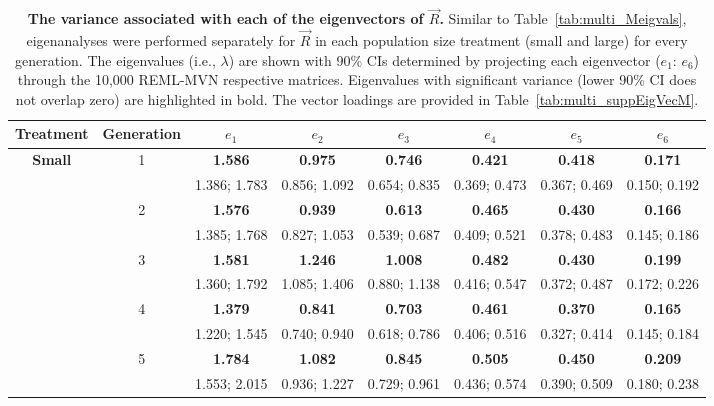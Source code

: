 \newpage
\begin{table}[!ht]
\renewcommand{\arraystretch}{0.9}
\caption[The variance associated with each of the eigenvectors of $\vec{R}$.]{\textbf{The variance associated with each of the eigenvectors of $\vec{R}$.} Similar to Table~\ref{tab:multi_Meigvals}, eigenanalyses were performed separately for $\vec{R}$ in each population size treatment (small and large) for every generation. The eigenvalues (i.e., $\lambda$) are shown with 90\% CIs determined by projecting each eigenvector ($e_1$: $e_6$) through the 10,000 REML-MVN respective matrices. Eigenvalues with significant variance (lower 90\% CI does not overlap zero) are highlighted in bold. The vector loadings are provided in Table~\ref{tab:multi_suppEigVecM}.}
\label{tab:multi_Reigvals}
\begin{center}
\scriptsize
\begin{tabular}{>{\bfseries}cccccccc}
\toprule
\textbf{Treatment}& \textbf{Generation} & $e_1$& $e_2$& $e_3$& $e_4$& $e_5$& {$e_6$} \\
\midrule
Small & 1 & \textbf{1.586} & \textbf{0.975} & \textbf{0.746} & \textbf{0.421} & \textbf{0.418} & \textbf{0.171} \\
 &  & 1.386; 1.783 & 0.856; 1.092 & 0.654; 0.835 & 0.369; 0.473 & 0.367; 0.469 & 0.150; 0.192\\[1.2ex]
 & 2 & \textbf{1.576} & \textbf{0.939} & \textbf{0.613} & \textbf{0.465} & \textbf{0.430} & \textbf{0.166} \\
 &  & 1.385; 1.768 & 0.827; 1.053 & 0.539; 0.687 & 0.409; 0.521 & 0.378; 0.483 & 0.145; 0.186\\[1.2ex][1.2ex]
 & 3 & \textbf{1.581} & \textbf{1.246} & \textbf{1.008} & \textbf{0.482} & \textbf{0.430} & \textbf{0.199} \\
 &  & 1.360; 1.792 & 1.085; 1.406 & 0.880; 1.138 & 0.416; 0.547 & 0.372; 0.487 & 0.172; 0.226\\[1.2ex]
 & 4 & \textbf{1.379} & \textbf{0.841} & \textbf{0.703} & \textbf{0.461} & \textbf{0.370} & \textbf{0.165} \\
 &  & 1.220; 1.545 & 0.740; 0.940 & 0.618; 0.786 & 0.406; 0.516 & 0.327; 0.414 & 0.145; 0.184\\[1.2ex]
 & 5 & \textbf{1.784} & \textbf{1.082} & \textbf{0.845} & \textbf{0.505} & \textbf{0.450} & \textbf{0.209} \\
 &  & 1.553; 2.015 & 0.936; 1.227 & 0.729; 0.961 & 0.436; 0.574 & 0.390; 0.509 & 0.180; 0.238\\[1.2ex]

\end{tabular}
\end{center}
\end{table}
